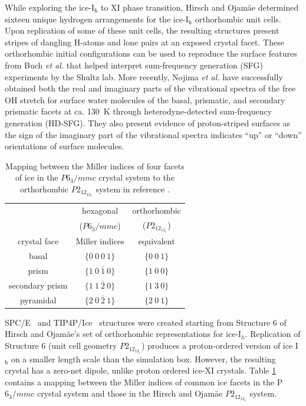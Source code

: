 While exploring the ice-I$_\mathrm{h}$ to XI phase transition, Hirsch
and Ojam\"{a}e determined sixteen unique hydrogen arrangements for the
ice-I$_\mathrm{h}$ orthorhombic unit cells.\cite{Hirsch2004} Upon
replication of some of these unit cells, the resulting structures
present stripes of dangling H-atoms and lone pairs at an exposed
crystal facet. These orthorhombic initial configurations can be used
to reproduce the surface features from Buch \textit{et
  al.}\cite{Buch2008} that helped interpret sum-frequency generation
(SFG) experiments by the Shultz lab.\cite{Groenzin07} More recently,
Nojima \textit{et al.}\cite{Nojima2017} have successfully obtained
both the real and imaginary parts of the vibrational spectra of the
free OH stretch for surface water molecules of the basal, prismatic,
and secondary prismatic facets at ca. 130~K through
heterodyne-detected sum-frequency generation (HD-SFG). They also
present evidence of proton-striped surfaces as the sign of the
imaginary part of the vibrational spectra indicates ``up'' or ``down''
orientations of surface molecules.

\begin{table}[h]
\centering
  \caption{Mapping between the Miller indices of four facets of ice in
    the $P6_3/mmc$ crystal system to the orthorhombic $P2_12_12_1$
    system in reference  \protect\citep{Hirsch04}.}
\label{tab:equiv}
\begin{tabular}{|ccc|} \hline
 & hexagonal & orthorhombic \\
 & ($P6_3/mmc$) & ($P2_12_12_1$) \\
 crystal face  & Miller indices & equivalent \\ \hline
basal & $\{0~0~0~1\}$ & $\{0~0~1\}$ \\
prism & $\{1~0~\bar{1}~0\}$ & $\{1~0~0\}$ \\
secondary prism & $\{1~1~\bar{2}~0\}$ & $\{1~3~0\}$ \\
pyramidal & $\{2~0~\bar{2}~1\}$ & $\{2~0~1\}$ \\ \hline
\end{tabular}
\end{table}

SPC/E~\cite{Berendsen1987} and TIP4P/Ice~\cite{Abascal2005} structures
were created starting from Structure 6 of Hirsch and Ojam\"{a}e's set
of orthorhombic representations for ice-I$_{h}$.\cite{Hirsch2004}
Replication of Structure 6 (unit cell geometry $P2_12_12_1$) produces a proton-ordered
version of ice I$_\mathrm{h}$ on a smaller length scale than the
simulation box. However, the resulting crystal has a zero-net dipole,
unlike proton ordered ice-XI crystals. Table \ref{tab:equiv} contains a
mapping between the Miller indices of common ice facets in the
P$6_3/mmc$ crystal system and those in the Hirsch and Ojam\"{a}e
$P2_12_12_1$ system.

